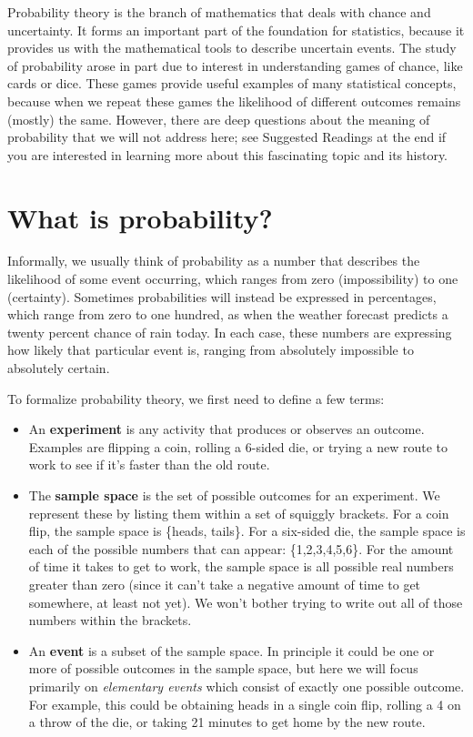 \documentclass[12pt,]{book}
\providecommand{\tightlist}{%
  \setlength{\itemsep}{0pt}\setlength{\parskip}{0pt}}
\theoremstyle{definition}
\theoremstyle{definition}
\theoremstyle{definition}
\theoremstyle{remark}
\begin{document}
Probability theory is the branch of mathematics that deals with chance and uncertainty. It forms an important part of the foundation for statistics, because it provides us with the mathematical tools to describe uncertain events. The study of probability arose in part due to interest in understanding games of chance, like cards or dice. These games provide useful examples of many statistical concepts, because when we repeat these games the likelihood of different outcomes remains (mostly) the same. However, there are deep questions about the meaning of probability that we will not address here; see Suggested Readings at the end if you are interested in learning more about this fascinating topic and its history.

\hypertarget{what-is-probability}{%
\section{What is probability?}\label{what-is-probability}}

Informally, we usually think of probability as a number that describes the likelihood of some event occurring, which ranges from zero (impossibility) to one (certainty). Sometimes probabilities will instead be expressed in percentages, which range from zero to one hundred, as when the weather forecast predicts a twenty percent chance of rain today. In each case, these numbers are expressing how likely that particular event is, ranging from absolutely impossible to absolutely certain.

To formalize probability theory, we first need to define a few terms:

\begin{itemize}
\tightlist
\item
  An \textbf{experiment} is any activity that produces or observes an outcome. Examples are flipping a coin, rolling a 6-sided die, or trying a new route to work to see if it's faster than the old route.
\item
  The \textbf{sample space} is the set of possible outcomes for an experiment. We represent these by listing them within a set of squiggly brackets. For a coin flip, the sample space is \{heads, tails\}. For a six-sided die, the sample space is each of the possible numbers that can appear: \{1,2,3,4,5,6\}. For the amount of time it takes to get to work, the sample space is all possible real numbers greater than zero (since it can't take a negative amount of time to get somewhere, at least not yet). We won't bother trying to write out all of those numbers within the brackets.
\item
  An \textbf{event} is a subset of the sample space. In principle it could be one or more of possible outcomes in the sample space, but here we will focus primarily on \emph{elementary events} which consist of exactly one possible outcome. For example, this could be obtaining heads in a single coin flip, rolling a 4 on a throw of the die, or taking 21 minutes to get home by the new route.
\end{itemize}
\end{document}
